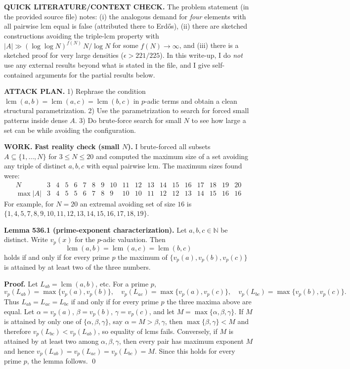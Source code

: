 \noindent\textbf{QUICK LITERATURE/CONTEXT CHECK.}
The problem statement (in the provided source file) notes:
(i) the analogous demand for \emph{four} elements with all pairwise lcm equal is false (attributed there to Erd\H{o}s),
(ii) there are sketched constructions avoiding the triple-lcm property with $|A|\gg (\log\log N)^{f(N)}\,N/\log N$ for some $f(N)\to\infty$, and
(iii) there is a sketched proof for very large densities ($\epsilon>221/225$).
In this write-up, I do \emph{not} use any external results beyond what is stated in the file, and I give self-contained arguments for the partial results below.

\noindent\textbf{ATTACK PLAN.}
1) Rephrase the condition $\operatorname{lcm}(a,b)=\operatorname{lcm}(a,c)=\operatorname{lcm}(b,c)$ in $p$-adic terms and obtain a clean structural parametrization.
2) Use the parametrization to search for forced small patterns inside dense $A$.
3) Do brute-force search for small $N$ to see how large a set can be while avoiding the configuration.

\noindent\textbf{WORK.}
\textbf{Fast reality check (small $N$).}
I brute-forced all subsets $A\subseteq\{1,\dots,N\}$ for $3\le N\le 20$ and computed the maximum size of a set avoiding any triple of distinct $a,b,c$ with equal pairwise lcm.
The maximum sizes found were:
\[
\begin{array}{c|cccccccccccccccccc}
N&3&4&5&6&7&8&9&10&11&12&13&14&15&16&17&18&19&20\\\hline
\max|A|&3&4&5&5&6&7&8&9&10&10&11&12&12&13&14&15&16&16
\end{array}
\]
For example, for $N=20$ an extremal avoiding set of size $16$ is
$\{1,4,5,7,8,9,10,11,12,13,14,15,16,17,18,19\}$.

\medskip
\textbf{Lemma 536.1 (prime-exponent characterization).}
Let $a,b,c\in\mathbb N$ be distinct. Write $v_p(x)$ for the $p$-adic valuation. Then
\[
\operatorname{lcm}(a,b)=\operatorname{lcm}(a,c)=\operatorname{lcm}(b,c)
\]
holds if and only if for every prime $p$ the maximum of $\{v_p(a),v_p(b),v_p(c)\}$ is attained by at least two of the three numbers.

\textbf{Proof.}
Let $L_{ab}=\operatorname{lcm}(a,b)$, etc. For a prime $p$,
\[
 v_p(L_{ab})=\max\{v_p(a),v_p(b)\},\quad
 v_p(L_{ac})=\max\{v_p(a),v_p(c)\},\quad
 v_p(L_{bc})=\max\{v_p(b),v_p(c)\}.
\]
Thus $L_{ab}=L_{ac}=L_{bc}$ if and only if for every prime $p$ the three maxima above are equal.
Let $\alpha=v_p(a)$, $\beta=v_p(b)$, $\gamma=v_p(c)$, and let $M=\max\{\alpha,\beta,\gamma\}$.
If $M$ is attained by only one of $\{\alpha,\beta,\gamma\}$, say $\alpha=M>\beta,\gamma$, then $\max\{\beta,\gamma\}<M$ and therefore $v_p(L_{bc})<v_p(L_{ab})$, so equality of lcms fails.
Conversely, if $M$ is attained by at least two among $\alpha,\beta,\gamma$, then every pair has maximum exponent $M$ and hence $v_p(L_{ab})=v_p(L_{ac})=v_p(L_{bc})=M$.
Since this holds for every prime $p$, the lemma follows. \qed

